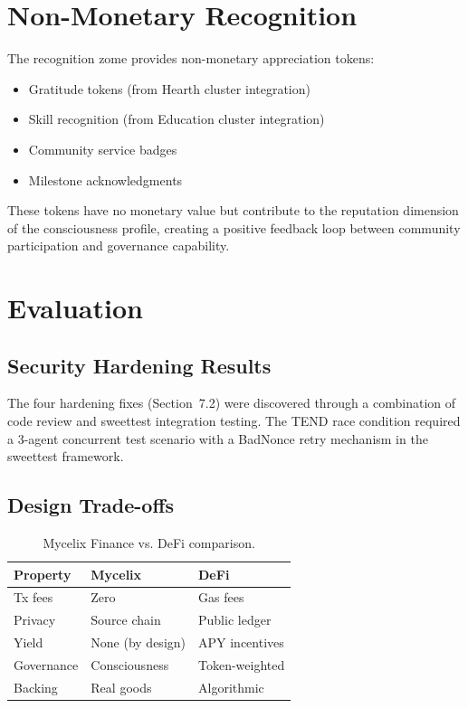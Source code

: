 \documentclass[11pt,twocolumn]{article}
\begin{document}
\section{Non-Monetary Recognition}

The recognition zome provides non-monetary appreciation tokens:

\begin{itemize}[nosep]
  \item Gratitude tokens (from Hearth cluster integration)
  \item Skill recognition (from Education cluster integration)
  \item Community service badges
  \item Milestone acknowledgments
\end{itemize}

These tokens have no monetary value but contribute to the reputation dimension
of the consciousness profile, creating a positive feedback loop between
community participation and governance capability.

\section{Evaluation}

\subsection{Security Hardening Results}

The four hardening fixes (Section~7.2) were discovered through a combination
of code review and sweettest integration testing. The TEND race condition
required a 3-agent concurrent test scenario with a BadNonce retry mechanism
in the sweettest framework.

\subsection{Design Trade-offs}

\begin{table}[h]
\centering
\begin{tabular}{lll}
\toprule
\textbf{Property} & \textbf{Mycelix} & \textbf{DeFi} \\
\midrule
Tx fees & Zero & Gas fees \\
Privacy & Source chain & Public ledger \\
Yield & None (by design) & APY incentives \\
Governance & Consciousness & Token-weighted \\
Backing & Real goods & Algorithmic \\
\bottomrule
\end{tabular}
\caption{Mycelix Finance vs. DeFi comparison.}
\end{table}
\end{document}
